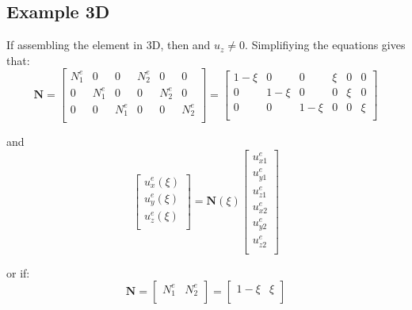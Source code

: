 \documentclass[10pt,b5paper,titlepage]{book}
\newcommand{\m}{\mathbf}
\begin{document}
\subsection{Example 3D}
If assembling the element in 3D, then and $ u_z \neq 0 $.
Simplifiying the equations gives that:
\begin{equation}
    \m{N} = \begin{bmatrix}
        N_1^e & 0 & 0 & N_2^e & 0 & 0 \\
        0 & N_1^e & 0 & 0 & N_2^e & 0 \\
        0 & 0 & N_1^e & 0 & 0 & N_2^e \\
    \end{bmatrix}
    = \begin{bmatrix}
        1 - \xi & 0 & 0 & \xi & 0 & 0 \\
        0 & 1 - \xi & 0 & 0 & \xi & 0  \\
        0 & 0 & 1 - \xi & 0 & 0 & \xi \\
    \end{bmatrix}
\end{equation}

and
\begin{equation}
    \begin{bmatrix}
        u_x^e(\xi) \\
        u_y^e(\xi) \\
        u_z^e(\xi) \\
    \end{bmatrix}
    = \m{N}(\xi) \begin{bmatrix}
        u_{x1}^e \\
        u_{y1}^e \\
        u_{z1}^e \\
        u_{x2}^e \\
        u_{y2}^e \\
        u_{z2}^e \\
    \end{bmatrix}
\end{equation}

or if:
\begin{equation}
    \m{N} = \begin{bmatrix}
        N_1^e & N_2^e \\
    \end{bmatrix}
    = \begin{bmatrix}
        1 - \xi & \xi \\
    \end{bmatrix}
\end{equation}
\end{document}
